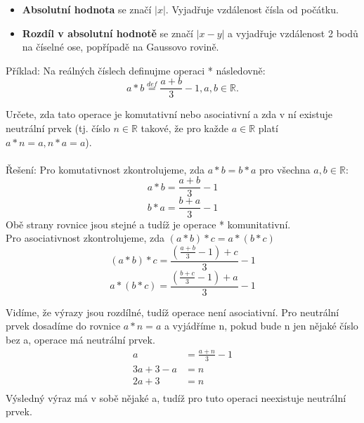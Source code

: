 \documentclass[12pt]{article}
\begin{document}
\begin{itemize} [itemsep = 2pt]
    \item \textbf{Absolutní hodnota} se značí $|x|$. Vyjadřuje vzdálenost čísla od počátku.
    \item \textbf{Rozdíl v absolutní hodnotě} se značí $|x-y|$ a vyjadřuje vzdálenost 2 bodů na číselné ose, popřípadě na Gaussovo rovině.
\end{itemize}

Příklad: Na reálných číslech definujme operaci * následovně: $$a*b \stackrel{def}{=} \frac{a + b}{3}-1, a,b \in \mathbb{R}.$$

Určete, zda tato operace je komutativní nebo asociativní a zda v ní existuje neutrální prvek (tj. číslo $n \in \mathbb{R}$ takové, že pro každe $a \in \mathbb{R}$ platí $a*n = a, n*a = a$).\\
\\
Řešení: Pro komutativnost zkontrolujeme, zda $a*b = b*a$ pro všechna $a,b \in \mathbb{R}$: \[a*b = \frac{a+b}{3}-1\] \[b*a = \frac{b+a}{3}-1\]
Obě strany rovnice jsou stejné a tudíž je operace * komunitativní.\\
Pro asociativnost zkontrolujeme, zda $(a*b)*c = a*(b*c)$\\ 
\[(a*b)*c = \frac{(\frac{a+b}{3}-1)+c}{3}-1 \]
\[a*(b*c) = \frac{(\frac{b+c}{3}-1)+a}{3}-1 \]

Vidíme, že výrazy jsou rozdílné, tudíž operace není asociativní. Pro neutrální prvek dosadíme do rovnice $a*n=a$ a vyjádříme n, pokud bude n jen nějaké číslo bez a, operace má neutrální prvek.
\begin{align*}
a &= \frac{a+n}{3}-1\\
3a + 3 - a &= n\\
2a + 3 &= n\\
\end{align*}
Výsledný výraz má v sobě nějaké a, tudíž pro tuto operaci neexistuje neutrální prvek.
\end{document}
